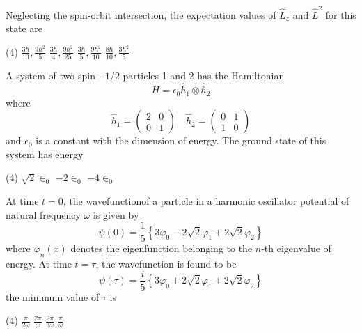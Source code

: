 \begin{questions}
\begin{minipage}{\textwidth}
	Neglecting the spin-orbit intersection, the expectation values of $\hat{L}_{z}$ and $\hat{L}^{2}$ for this state are
\end{minipage}
\begin{tasks}(4)
	\task[\textbf{A.}] $\frac{3 \hbar}{10}, \frac{9 \hbar^{2}}{5}$
	\task[\textbf{B.}] $\frac{3 \hbar}{4}, \frac{9 \hbar^{2}}{25}$
	\task[\textbf{C.}]   $\frac{3 \hbar}{5}, \frac{9 \hbar^{2}}{10}$
	\task[\textbf{D.}] $\frac{8 \hbar}{10}, \frac{3 \hbar^{2}}{5}$
\end{tasks}
\begin{minipage}{\textwidth}
	\question A system of two spin - $1 / 2$ particles 1 and 2 has the Hamiltonian
	$$
	H=\epsilon_{0} \hat{\hbar}_{1} \otimes \hat{\hbar}_{2}
	$$
	where
	$$
	\hat{\hbar}_{1}=\left(\begin{array}{ll}
	2 & 0 \\
	0 & 1
	\end{array}\right) \quad \hat{\hbar}_{2}=\left(\begin{array}{ll}
	0 & 1 \\
	1 & 0
	\end{array}\right)
	$$
	and $\epsilon_{0}$ is a constant with the dimension of energy. The ground state of this system has energy
\end{minipage}
\begin{tasks}(4)
	\task[\textbf{A.}] $\sqrt{2} \in_{0}$
	\task[\textbf{C.}] $-2 \in_{0}$
	\task[\textbf{D.}] $-4 \in_{0}$
\end{tasks}
\begin{minipage}{\textwidth}
	\question At time $t=0$, the wavefunctionof a particle in a harmonic oscillator potential of natural frequency $\omega$ is given by
	$$
	\psi(0)=\frac{1}{5}\left\{3 \varphi_{0}-2 \sqrt{2} \varphi_{1}+2 \sqrt{2} \varphi_{2}\right\}
	$$
	where $\varphi_{n}(x)$ denotes the eigenfunction belonging to the $n$-th eigenvalue of energy. At time $t=\tau$, the wavefunction is found to be
	$$
	\psi(\tau)=\frac{i}{5}\left\{3 \varphi_{0}+2 \sqrt{2} \varphi_{1}+2 \sqrt{2} \varphi_{2}\right\}
	$$
	the minimum value of $\tau$ is
\end{minipage}
\begin{tasks}(4)
	\task[\textbf{A.}] $\frac{\pi}{2 \omega}$
	\task[\textbf{B.}] $\frac{2 \pi}{\omega}$
	\task[\textbf{C.}] $\frac{2 \pi}{3 \omega}$
	\task[\textbf{D.}]   $\frac{\pi}{\omega}$
\end{tasks}
\begin{minipage}{\textwidth}

\end{minipage}
\end{questions}
